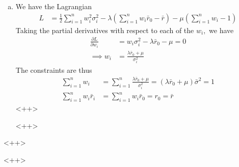 \documentclass{article}
\begin{document}
\begin{enumerate}
\begin{enumerate}[(a)]
			\item 
				\begin{soln}
					We have the Lagrangian
					\begin{align*}
						L &= \frac{1}{2} \sum_{i=1}^{n} w_i^2\sigma_i^2 - \lambda\left( \sum_{i=1}^{n} w_i \bar r_0 - \bar r \right) - \mu\left( \sum_{i=1}^{n} w_i - 1 \right)
					\end{align*}
					Taking the partial derivatives with respect to each of the $w_i,$ we have
					\begin{align*}
						\frac{\partial L}{\partial w_i} &= w_i\sigma_i^2 - \lambda \bar r_0 - \mu = 0 \\
						\implies w_i &= \frac{\lambda \bar r_0 + \mu}{\sigma_i^2}
					\end{align*}
					The constraints are thus
					\begin{align*}
						\sum_{i=1}^{n} w_i &= \sum_{i=1}^{n} \frac{\lambda \bar r_0 + \mu}{\sigma_i^2} = (\lambda \bar r_0 + \mu)\bar \sigma^2  = 1 \\
						\sum_{i=1}^{n} w_i \bar r_i &= \sum_{i=1}^{n} w_i \bar r_0 = r_0 = \bar r
					\end{align*}<++>
				\end{soln}<++>
		\end{enumerate}<++>
\end{enumerate}<++>
\end{document}
